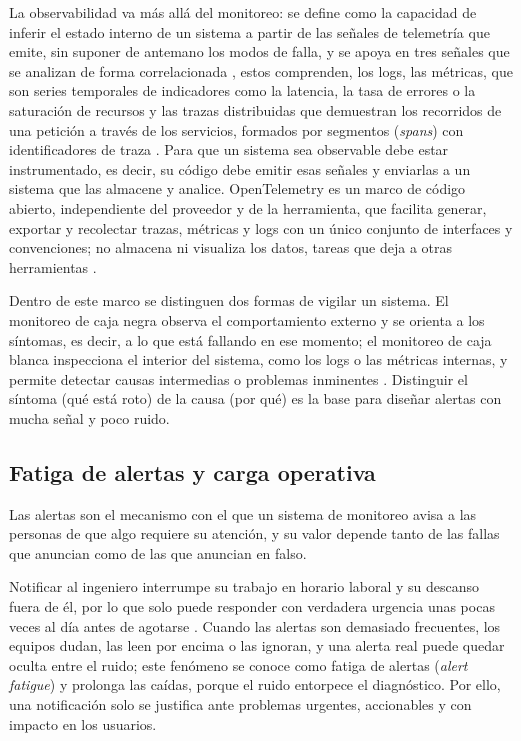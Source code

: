 La observabilidad va más allá del monitoreo: se define como la capacidad de inferir el estado interno de un sistema a partir de las señales de telemetría que emite, sin suponer de antemano los modos de falla, y se apoya en tres señales que se analizan de forma correlacionada \cite{nellutla2026_observability}, estos comprenden, los logs, las métricas, que son series temporales de indicadores como la latencia, la tasa de errores o la saturación de recursos y las trazas distribuidas que demuestran los recorridos de una petición a través de los servicios, formados por segmentos (\textit{spans}) con identificadores de traza \cite{nellutla2026_observability}. Para que un sistema sea observable debe estar instrumentado, es decir, su código debe emitir esas señales y enviarlas a un sistema que las almacene y analice. OpenTelemetry es un marco de código abierto, independiente del proveedor y de la herramienta, que facilita generar, exportar y recolectar trazas, métricas y logs con un único conjunto de interfaces y convenciones; no almacena ni visualiza los datos, tareas que deja a otras herramientas \cite{opentelemetry_docs}.

Dentro de este marco se distinguen dos formas de vigilar un sistema. El monitoreo de caja negra observa el comportamiento externo y se orienta a los síntomas, es decir, a lo que está fallando en ese momento; el monitoreo de caja blanca inspecciona el interior del sistema, como los logs o las métricas internas, y permite detectar causas intermedias o problemas inminentes \cite{ewaschuk2016_sre_monitoring}. Distinguir el síntoma (qué está roto) de la causa (por qué) es la base para diseñar alertas con mucha señal y poco ruido.

\subsection{Fatiga de alertas y carga operativa}\label{sec:ant_fatiga}

Las alertas son el mecanismo con el que un sistema de monitoreo avisa a las personas de que algo requiere su atención, y su valor depende tanto de las fallas que anuncian como de las que anuncian en falso.

Notificar al ingeniero interrumpe su trabajo en horario laboral y su descanso fuera de él, por lo que solo puede responder con verdadera urgencia unas pocas veces al día antes de agotarse \cite{ewaschuk2016_sre_monitoring}. Cuando las alertas son demasiado frecuentes, los equipos dudan, las leen por encima o las ignoran, y una alerta real puede quedar oculta entre el ruido; este fenómeno se conoce como fatiga de alertas (\textit{alert fatigue}) y prolonga las caídas, porque el ruido entorpece el diagnóstico. Por ello, una notificación solo se justifica ante problemas urgentes, accionables y con impacto en los usuarios.

